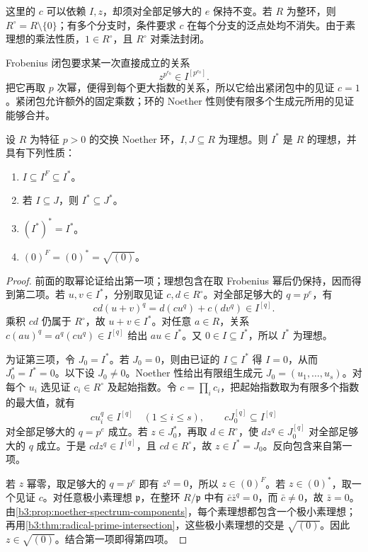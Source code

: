 这里的 \(c\) 可以依赖 \(I,z\)，却须对全部足够大的 \(e\) 保持不变。若 \(R\) 为整环，则 \(R^\circ=R\setminus\{0\}\)；有多个分支时，条件要求 \(c\) 在每个分支的泛点处均不消失。由于素理想的乘法性质，\(1\in R^\circ\)，且 \(R^\circ\) 对乘法封闭。

\ProseParagraphBreak
Frobenius 闭包要求某一次直接成立的关系
\[
	z^{p^{e_0}}\in I^{[p^{e_0}]}.
\]
把它再取 \(p\) 次幂，便得到每个更大指数的关系，所以它给出紧闭包中的见证 \(c=1\)。紧闭包允许额外的固定乘数；环的 Noether 性则使有限多个生成元所用的见证能够合并。

\begin{proposition}\label{b3:prop:C-tight-closure-properties}
	设 \(R\) 为特征 \(p>0\) 的交换 Noether 环，\(I,J\subseteq R\) 为理想。则 \(I^*\) 是 \(R\) 的理想，并具有下列性质：
	\begin{enumerate}
		\item \(I\subseteq I^F\subseteq I^*\)。
		\item 若 \(I\subseteq J\)，则 \(I^*\subseteq J^*\)。
		\item \((I^*)^*=I^*\)。
		\item \((0)^F=(0)^*=\sqrt{(0)}\)。
	\end{enumerate}
\end{proposition}
\begin{proof}
	前面的取幂论证给出第一项；理想包含在取 Frobenius 幂后仍保持，因而得到第二项。若 \(u,v\in I^*\)，分别取见证 \(c,d\in R^\circ\)。对全部足够大的 \(q=p^e\)，有
	\[
		cd(u+v)^q=d(cu^q)+c(dv^q)\in I^{[q]}.
	\]
	乘积 \(cd\) 仍属于 \(R^\circ\)，故 \(u+v\in I^*\)。对任意 \(a\in R\)，关系 \(c(au)^q=a^q(cu^q)\in I^{[q]}\) 给出 \(au\in I^*\)。又 \(0\in I\subseteq I^*\)，所以 \(I^*\) 为理想。

	为证第三项，令 \(J_0=I^*\)。若 \(J_0=0\)，则由已证的 \(I\subseteq I^*\) 得 \(I=0\)，从而 \(J_0^*=I^*=0\)。以下设 \(J_0\ne0\)。Noether 性给出有限组生成元 \(J_0=(u_1,\ldots,u_s)\)。对每个 \(u_i\) 选见证 \(c_i\in R^\circ\) 及起始指数。令 \(c=\prod_i c_i\)，把起始指数取为有限多个指数的最大值，就有
	\[
		c u_i^q\in I^{[q]}\quad(1\le i\le s),\qquad
		cJ_0^{[q]}\subseteq I^{[q]}
	\]
	对全部足够大的 \(q=p^e\) 成立。若 \(z\in J_0^*\)，再取 \(d\in R^\circ\)，使 \(dz^q\in J_0^{[q]}\) 对全部足够大的 \(q\) 成立。于是 \(cdz^q\in I^{[q]}\)，且 \(cd\in R^\circ\)，故 \(z\in I^*=J_0\)。反向包含来自第一项。

	若 \(z\) 幂零，取足够大的 \(q=p^e\) 即有 \(z^q=0\)，所以 \(z\in(0)^F\)。若 \(z\in(0)^*\)，取一个见证 \(c\)。对任意极小素理想 \(\mathfrak p\)，在整环 \(R/\mathfrak p\) 中有 \(\bar c\bar z^q=0\)，而 \(\bar c\ne0\)，故 \(\bar z=0\)。由\cref{b3:prop:noether-spectrum-components}，每个素理想都包含一个极小素理想；再用\cref{b3:thm:radical-prime-intersection}，这些极小素理想的交是 \(\sqrt{(0)}\)。因此 \(z\in\sqrt{(0)}\)。结合第一项即得第四项。
\end{proof}

